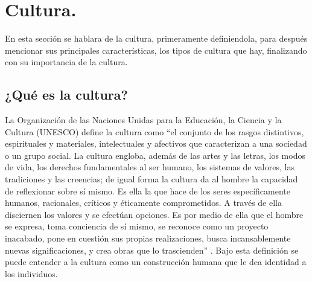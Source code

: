 \section{Cultura.}\label{cultura}
        En esta sección se hablara de la cultura, primeramente definiendola, para 
        después mencionar sus principales características, los tipos de cultura que 
        hay, finalizando con su importancia de la cultura.
        
        \subsection{¿Qué es la cultura?}\label{CulturaDef}
        La Organización de las Naciones Unidas para la Educación, la Ciencia y la 
        Cultura (UNESCO) define la cultura como “el conjunto de los rasgos 
        distintivos, espirituales y materiales, intelectuales y afectivos que 
        caracterizan a una sociedad o un grupo social. La cultura engloba, además 
        de las artes y las letras, los modos de vida, los derechos fundamentales 
        al ser humano, los sistemas de valores, las tradiciones y las creencias; 
        de igual forma la cultura da al hombre la capacidad de reflexionar sobre 
        sí mismo. Es ella la que hace de los seres específicamente humanos, 
        racionales, críticos y éticamente comprometidos. A través de ella 
        disciernen los valores y se efectúan opciones. Es por medio de ella que 
        el hombre se expresa, toma conciencia de sí mismo, se reconoce como un 
        proyecto inacabado, pone en cuestión sus propias realizaciones, busca 
        incansablemente nuevas significaciones, y crea obras que lo 
        trascienden\cite{RefCultura}” . Bajo esta definición se puede entender a la 
        cultura como un construcción humana que le dea identidad a los individuos. 
        
